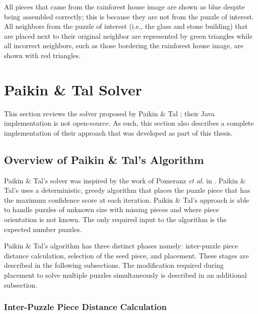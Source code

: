\documentclass{report}
\begin{document}
All pieces that came from the rainforest house image are shown as blue despite being assembled correctly; this is because they are not from the puzzle of interest.  All neighbors from the puzzle of interest (i.e., the glass and stone building) that are placed next to their original neighbor are represented by green triangles while all incorrect neighbors, such as those bordering the rainforest house image, are shown with red triangles.









\pagebreak
\section{Paikin \& Tal Solver}\label{sec:paikinTalSolver}

This section reviews the solver proposed by Paikin \& Tal \cite{paikin2015}; their Java implementation is not open-source.  As such, this section also describes a complete implementation of their approach that was developed as part of this thesis.

\subsection{Overview of Paikin \& Tal's Algorithm}\label{sec:paikinTalAlgorithm}

Paikin \& Tal's solver was inspired by the work of Pomeranz \textit{et al.} in \cite{pomeranz2011}.  Paikin \& Tal's uses a deterministic, greedy algorithm that places the puzzle piece that has the maximum confidence score at each iteration. Paikin \& Tal's approach is able to handle puzzles of unknown size with missing pieces and where piece orientation is not known.  The only required input to the algorithm is the expected number puzzles.

Paikin \& Tal's algorithm has three distinct phases namely: inter-puzzle piece distance calculation, selection of the seed piece, and placement.  These stages are described in the following subsections.  The modification required during placement to solve multiple puzzles simultaneously is described in an additional subsection.

\subsubsection{Inter-Puzzle Piece Distance Calculation}\label{sec:paikinTalInterPieceDistance}
\end{document}
